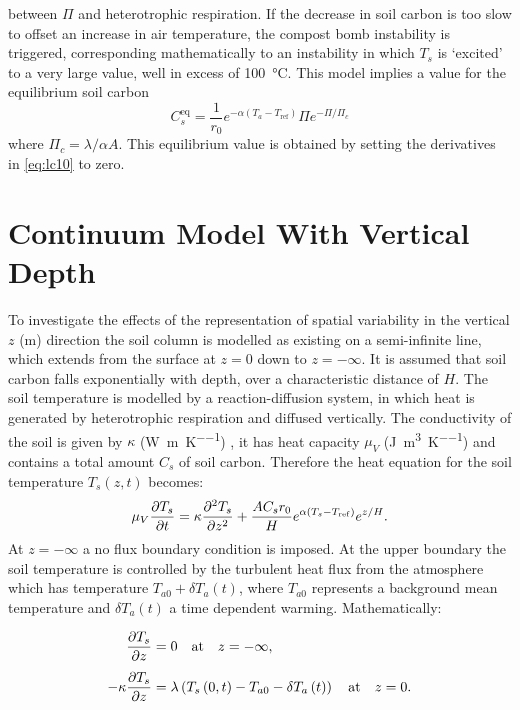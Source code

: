 between $\Pi$ and heterotrophic respiration.  
If the decrease in soil carbon is too slow to offset an increase in air temperature, the compost bomb instability is triggered, corresponding mathematically to an instability in which
$T_s$ is `excited' to a very large value, well in excess of \SI{100}{\degreeCelsius}. This model implies a value for the equilibrium soil carbon
\begin{equation}
  \label{eq:equilibrium_soil_carbon}
  C_s^{\mathrm{eq}} = \frac{1}{r_0}e^{-\alpha \left( T_a - T_{\mathrm{ref}}\right)} \Pi e^{-\Pi/\Pi_c}
\end{equation}
where $\Pi_c = \lambda /\alpha A$. This equilibrium value is obtained by setting the derivatives in \cref{eq:lc10} to zero.

\section{Continuum Model With Vertical Depth}
\label{sec:continuum_model}
To investigate the effects of the representation of spatial variability in the vertical $z$ (\si{\meter}) direction the soil column is
modelled as existing on a semi-infinite line, which extends from the surface at $z = 0$ down to $z = -\infty$. It is assumed that soil carbon
falls exponentially with depth, over a characteristic distance of $H$. The soil temperature is modelled by a reaction-diffusion system, in which heat is generated
by heterotrophic respiration and diffused vertically. The conductivity of the soil is given by $\kappa$ (\si{\watt\per\meter\per\kelvin}) \parencite{Best2005},
it has heat capacity $\mu_V$ (\si{\joule\per\cubic\meter\per\kelvin}) and contains a total amount $C_s$ of soil carbon. Therefore the heat equation
for the soil temperature $T_s(z,t)$ becomes:
\begin{equation}
  \label{eq:one_d_model}
  \mu_V \pdv{T_s}{t} = \kappa \pdv[2]{T_s}{z} + \frac{AC_sr_0}{H}e^{\alpha (T_s - T_{\mathrm{ref}})}e^{z/H}.
\end{equation}
At $z=-\infty$ a no flux boundary condition is imposed.
At the upper boundary the soil temperature is controlled by the turbulent heat flux from the atmosphere which has temperature
$T_{a0} + \delta T_a(t)$, where $T_{a0}$ represents a background mean temperature and $\delta T_a(t)$ a time dependent warming. Mathematically:

\begin{subequations}
  \label{eq:dimensional_bcs_nonuniform}
  \begin{align}
  \pdv{T_s}{z} &= 0 \quad \mathrm{at} \quad z = -\infty,\label{subeq:dimensional_bcs_nonuniform_lower} \\[1ex] 
  - \kappa\pdv{T_s}{z} &=   \lambda\left(T_s\left(0,t\right) - T_{a0} - \delta T_a\left(t\right)\right) \quad \mathrm{at}\quad z = 0.\label{subeq:dimensional_bcs_nonuniform_upper}
  \end{align}
\end{subequations}

